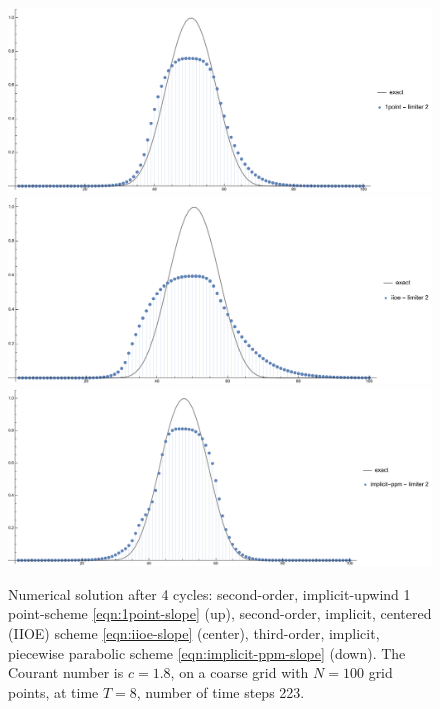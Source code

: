 \documentclass[../thesis.tex]{subfiles}
\begin{document}
\begin{figure}[H]
	\centering
	\includegraphics[width=\textwidth]{fig-1point-c1p8-T8-limit2-smooth.pdf}
	\includegraphics[width=\textwidth]{fig-iioe-c1p8-T8-limit2-smooth.pdf}
	\includegraphics[width=\textwidth]{fig-implicit-ppm-c1p8-T8-limit2-smooth.pdf}
	\caption{Numerical solution after 4 cycles: second-order, implicit-upwind 1 point-scheme \eqref{eqn:1point-slope} (up), second-order, implicit, centered (IIOE) scheme \eqref{eqn:iioe-slope} (center), third-order, implicit, piecewise parabolic scheme \eqref{eqn:implicit-ppm-slope} (down). The Courant number is \(c = 1.8\), on a coarse grid with \(N = 100\) grid points, at time \(T = 8\), number of time steps 223.}
	\label{fig:c1p8-T8-limit2-smooth}
\end{figure}
\end{document}
